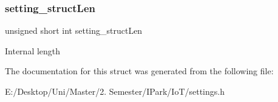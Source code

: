 \subsubsection{\texorpdfstring{setting\+\_\+struct\+Len}{setting\_structLen}}
{\footnotesize\ttfamily unsigned short int setting\+\_\+struct\+Len}

Internal length 

The documentation for this struct was generated from the following file\+:\begin{DoxyCompactItemize}
\item 
E\+:/\+Desktop/\+Uni/\+Master/2. Semester/\+I\+Park/\+Io\+T/settings.\+h\end{DoxyCompactItemize}
